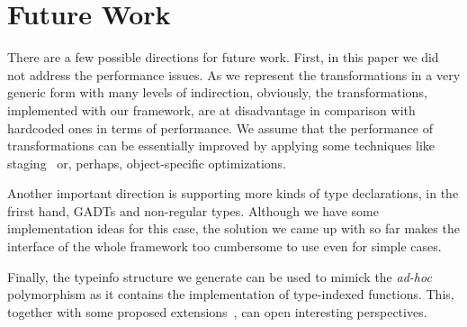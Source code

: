 \section{Future Work}

There are a few possible directions for future work. First, in this paper we did not address the performance issues. As we represent
the transformations in a very generic form with many levels of indirection, obviously, the transformations, implemented with
our framework, are at disadvantage in comparison with hardcoded ones in terms of performance. We assume that the performance of transformations
can be essentially improved by applying some techniques like staging~\cite{Staged} or, perhaps, object-specific optimizations.

Another important direction is supporting more kinds of type declarations, in the frirst hand, GADTs and non-regular types. Although we have some
implementation ideas for this case, the solution we came up with so far makes the interface of the whole framework too cumbersome to use even for
simple cases.

Finally, the typeinfo structure we generate can be used to mimick the \emph{ad-hoc} polymorphism as it contains the implementation of
type-indexed functions. This, together with some proposed extensions~\cite{ModularImplicits}, can open interesting perspectives.

